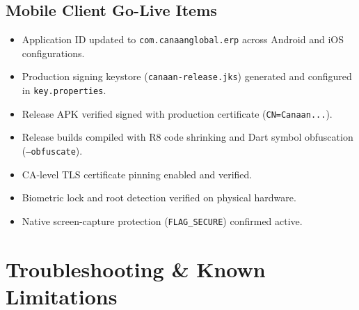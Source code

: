 \documentclass[11pt,a4paper]{article}
\begin{document}
\subsection{Mobile Client Go-Live Items}
\begin{itemize}[leftmargin=1.6em,itemsep=3pt,label={\color{codestring}\checkmark}]
  \item Application ID updated to \texttt{com.canaanglobal.erp} across Android and iOS configurations.
  \item Production signing keystore (\texttt{canaan-release.jks}) generated and configured in \texttt{key.properties}.
  \item Release APK verified signed with production certificate (\texttt{CN=Canaan...}).
  \item Release builds compiled with R8 code shrinking and Dart symbol obfuscation (\texttt{--obfuscate}).
  \item CA-level TLS certificate pinning enabled and verified.
  \item Biometric lock and root detection verified on physical hardware.
  \item Native screen-capture protection (\texttt{FLAG\_SECURE}) confirmed active.
\end{itemize}

\section{Troubleshooting \& Known Limitations}
\end{document}
